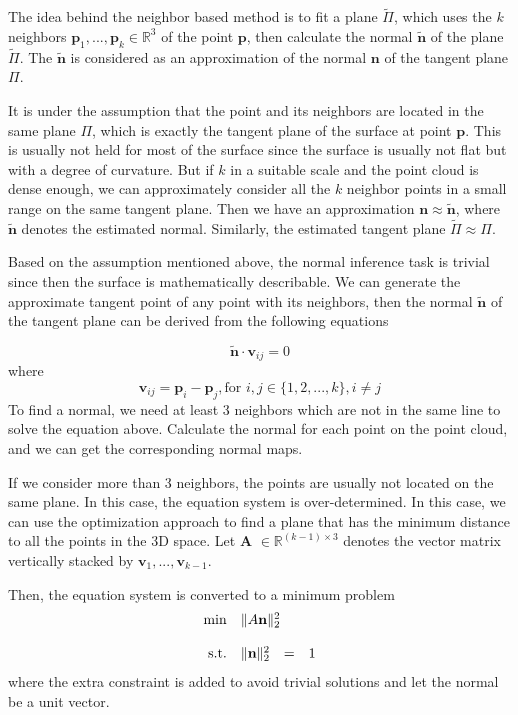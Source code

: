 The idea behind the neighbor based method is to fit a plane $ \tilde\Pi $, which uses the $ k $ neighbors $ \textbf{p}_1, ..., \textbf{p}_k \in \mathbb{R}^3 $ of the point $ \textbf{p} $, then calculate the normal $ \tilde{\textbf{n}} $ of the plane $ \tilde\Pi $. The $ \tilde{\textbf{n}} $ is considered as an approximation of the normal $ \textbf{n} $ of the tangent plane $ \Pi $.

It is under the assumption that the point and its neighbors are located in the same plane $ \Pi $, which is exactly the tangent plane of the surface at point $\textbf{p}  $. 
This is usually not held for most of the surface since the surface is usually not flat but with a degree of curvature. But if $ k $ in a suitable scale and the point cloud is dense enough, we can approximately consider all the $ k $ neighbor points in a small range on the same tangent plane. Then we have an approximation $ \textbf{n} \approx \tilde{\textbf{n}}$, where $ \tilde{\textbf{n}} $ denotes the estimated normal. Similarly, the estimated tangent plane $ \tilde{\Pi} \approx \Pi $. 

Based on the assumption mentioned above, the normal inference task is trivial since then the surface is mathematically describable. We can generate the approximate tangent point of any point with its neighbors, then the normal $ \tilde{\textbf{n}} $ of the tangent plane can be derived from the following equations

\[\tilde{\textbf{n}} \cdot \textbf{v}_{ij}  = 0 \]
where 
\[ \textbf{v}_{ij} = \textbf{p}_i - \textbf{p}_j, \text{for } i, j \in \{ 1,2,...,k\}, i\neq j \]
To find a normal, we need at least 3 neighbors which are not in the same line to solve the equation above. Calculate the normal for each point on the point cloud, and we can get the corresponding normal maps. 

If we consider more than 3 neighbors, the points are usually not located on the same plane. In this case, the equation system is over-determined. In this case, we can use the optimization approach to find a plane that has the minimum distance to all the points in the 3D space. Let  $ \textbf{A }\in \mathbb{R}^{(k-1)\times 3} $  denotes the vector  matrix vertically stacked by $ \textbf{v}_1, ..., \textbf{v}_{k-1} $. 

Then, the equation system is converted to a minimum problem 
\begin{equation}
	\begin{array}{rrclcl}
		\displaystyle \min & \multicolumn{3}{l}{\| A  \bn \|^2_2} \\
		\\
		\textrm{s.t.} & \| \bn \|^2_2 & = & 1 
	\end{array}
\end{equation}
where the extra constraint is added to avoid trivial solutions and let the normal be a unit vector.

